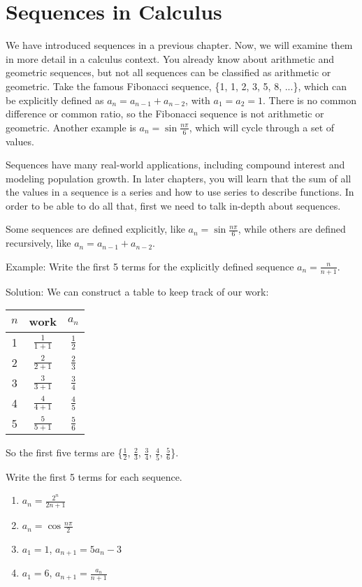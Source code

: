 \chapter{Sequences in Calculus}

We have introduced sequences in a previous chapter. Now, we will 
examine them in more detail in a calculus context. You already know 
about arithmetic and geometric sequences, but not all sequences can 
be classified as arithmetic or geometric. Take the famous Fibonacci 
sequence, \{1, 1, 2, 3, 5, 8, ...\}, which can be explicitly defined 
as $a_n = a_{n-1} + a_{n-2}$, with $a_1 = a_2 = 1$. There is no 
common difference or common ratio, so the Fibonacci sequence is not 
arithmetic or geometric. Another example is $a_n = 
\sin{\frac{n\pi}{6}}$, which will cycle through a set of values. 

Sequences have many real-world applications, including compound 
interest and modeling population growth. In later chapters, you will 
learn that the sum of all the values in a sequence is a series and 
how to use series to describe functions. In order to be able to do 
all that, first we need to talk in-depth about sequences. 

Some sequences are defined explicitly, like $a_n = 
\sin{\frac{n\pi}{6}}$, while others are defined recursively, like $a_n 
= a_{n-1} + a_{n-2}$. 

Example: Write the first 5 terms for the explicitly defined sequence 
$a_n = \frac{n}{n+1}$.

Solution: We can construct a table to keep track of our work:
\begin{center}
\begin{tabular}{|c|c|c|}\hline
$n$ & work & $a_n$\\
\hline
1 & $\frac{1}{1+1}$ & $\frac{1}{2}$\\
\hline
2 & $\frac{2}{2+1}$ & $\frac{2}{3}$\\
\hline
3 & $\frac{3}{3+1}$ & $\frac{3}{4}$\\
\hline
4 & $\frac{4}{4+1}$ & $\frac{4}{5}$\\
\hline
5 & $\frac{5}{5+1}$ & $\frac{5}{6}$\\
\hline
\end{tabular}
\end{center}

So the first five terms are \{$\frac{1}{2}$, $\frac{2}{3}$, 
$\frac{3}{4}$, $\frac{4}{5}$, $\frac{5}{6}$\}. 

\begin{Exercise}[label = seqcalc1]
Write the first 5 terms for each sequence. 
\begin{enumerate}
\item $a_n = \frac{2^n}{2n+1}$
\item $a_n = \cos{\frac{n\pi}{2}}$
\item $a_1 = 1$, $a_{n+1} = 5a_n-3$
\item $a_1 = 6$, $a_{n+1} = \frac{a_n}{n+1}$
\end{enumerate}
\end{Exercise}

